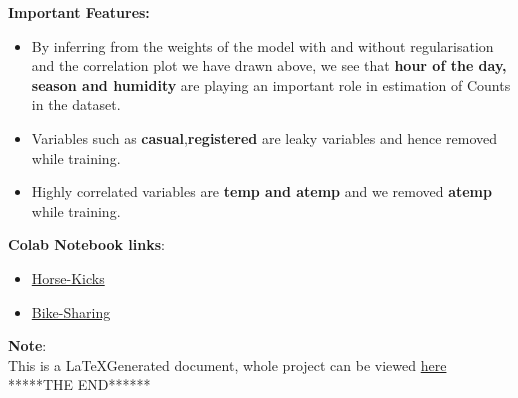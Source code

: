 \documentclass[english,a4paper,12pt]{article}
\begin{document}
\begin{enumerate}
\textbullet\textbf{Important Features:}
\begin{itemize}
    \item By inferring from the weights of the model with and without regularisation and the correlation plot we have drawn above,  we see that \textbf{hour of the day, season and humidity} are playing an important role in estimation of Counts in the dataset.
    \item Variables such as \textbf{casual},\textbf{registered} are leaky variables and hence removed while training.
    \item Highly correlated variables are \textbf{temp and atemp} and we removed \textbf{atemp} while training.
\end{itemize}

 {\textbf{Colab Notebook links}}:
\begin{itemize}
    \item \href{https://colab.research.google.com/drive/1RIH4N19g8it21CmKt_tUkKTUPszNoOGc?usp=sharing}{Horse-Kicks}
    \item \href{https://colab.research.google.com/drive/13H5d6ahvjZSX75n3Lm-WQh5V6Pe4IM3P?usp=sharing}{Bike-Sharing}
\end{itemize}


\end{enumerate}
\textbf{Note}: \\ 
This is a \LaTeX Generated document,
whole project can be viewed \href{https://www.overleaf.com/read/vddfhzgctpvn}{here}
\vspace{2cm}
\center ******THE END******
\newpage    
\end{document}

